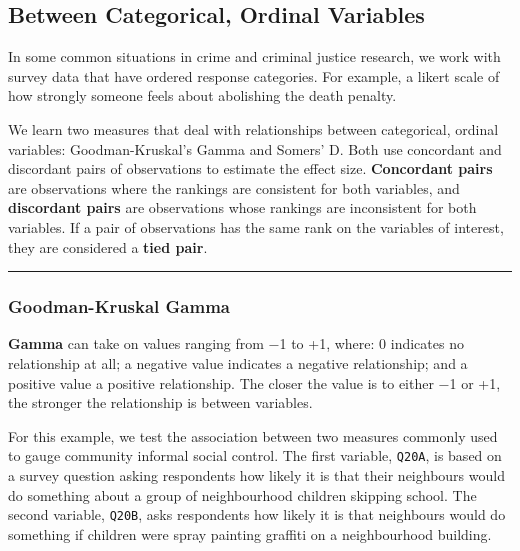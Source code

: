 \documentclass[
]{book}
\newenvironment{Shaded}{\begin{snugshade}}{\end{snugshade}}
\newcommand{\CommentTok}[1]{\textcolor[rgb]{0.56,0.35,0.01}{\textit{#1}}}
\newcommand{\FunctionTok}[1]{\textcolor[rgb]{0.00,0.00,0.00}{#1}}
\newcommand{\NormalTok}[1]{#1}
\newcommand{\SpecialCharTok}[1]{\textcolor[rgb]{0.00,0.00,0.00}{#1}}
\begin{document}
\hypertarget{between-categorical-ordinal-variables}{%
\subsection{Between Categorical, Ordinal Variables}\label{between-categorical-ordinal-variables}}

In some common situations in crime and criminal justice research, we work with survey data that have ordered response categories. For example, a likert scale of how strongly someone feels about abolishing the death penalty.

We learn two measures that deal with relationships between categorical, ordinal variables: Goodman-Kruskal's Gamma and Somers' D. Both use concordant and discordant pairs of observations to estimate the effect size. \textbf{Concordant pairs} are observations where the rankings are consistent for both variables, and \textbf{discordant pairs} are observations whose rankings are inconsistent for both variables. If a pair of observations has the same rank on the variables of interest, they are considered a \textbf{tied pair}.

\begin{center}\rule{0.5\linewidth}{0.5pt}\end{center}

\hypertarget{goodman-kruskal-gamma}{%
\subsubsection{Goodman-Kruskal Gamma}\label{goodman-kruskal-gamma}}

\textbf{Gamma} can take on values ranging from −1 to +1, where: 0 indicates no relationship at all; a negative value indicates a negative relationship; and a positive value a positive relationship. The closer the value is to either −1 or +1, the stronger the relationship is between variables.

For this example, we test the association between two measures commonly used to gauge community informal social control. The first variable, \texttt{Q20A}, is based on a survey question asking respondents how likely it is that their neighbours would do something about a group of neighbourhood children skipping school. The second variable, \texttt{Q20B}, asks respondents how likely it is that neighbours would do something if children were spray painting graffiti on a neighbourhood building.

\begin{Shaded}
\end{Shaded}
\end{document}
